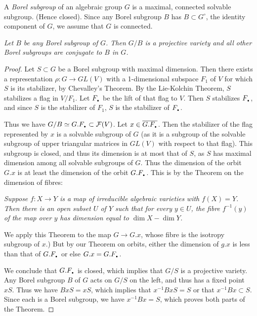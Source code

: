 \documentclass[12pt]{amsart}
\begin{document}
A {\sl Borel subgroup} of an algebraic group $G$ is a maximal, connected
solvable subgroup.  (Hence closed).
Since any Borel subgroup $B$ has $B\subset G^{\circ}$, the identity
component of $G$, we assume that $G$ is connected.
\medskip

{\it
Let $B$ be any Borel subgroup of $G$.
Then $G/B$ is a projective variety and all other Borel subgroups are
conjugate to $B$ in $G$.}\medskip

\begin{proof}
Let $S\subset G$ be a Borel subgroup with maximal dimension.
Then there exists a representation $\rho:G\to GL(V)$ with a 1-dimensional
subspace $F_1$ of $V$ for which $S$ is its stabilizer, by Chevalley's
Theorem. 
By the Lie-Kolchin Theorem, $S$ stabilizes a flag in $V/F_1$.
Let $F_{{\mbox{\Large\bf .}}}$ be the lift of that flag to $V$.
Then $S$ stabilizes $F_{{\mbox{\Large\bf .}}}$, and since $S$ is the stabilizer of $F_1$,
$S$ is the stabilizer of $F_{{\mbox{\Large\bf .}}}$.

Thus we have $G/B\simeq G.F_{{\mbox{\Large\bf .}}}\subset {\mathcal F}(V)$.
Let $x\in \overline{G.F_{{\mbox{\Large\bf .}}}}$.
Then the stabilizer of the flag represented by $x$ is a solvable subgroup of
$G$ (as it is a subgroup of the solvable subgroup of upper triangular
matrices in $GL(V)$ with respect to that flag).
This subgroup is closed, and thus its dimension is at most that of $S$, as
$S$ has maximal dimension among all solvable subgroups of $G$.
Thus the dimension of the orbit $G.x$ is at least the dimension of the orbit
$G.F_{{\mbox{\Large\bf .}}}$.
This is by the Theorem on the dimension of fibres:
\medskip

{\it 
Suppose $f:X\to Y$ is a map of irreducible algebraic varieties with
$f(X)=Y$. 
Then there is an open subset $U$ of $Y$ such that for every $y\in U$, the
fibre $f^{-1}(y)$ of the map over $y$ has  dimension equal to
$\dim X - \dim Y$.
}\medskip

We apply this Theorem to the map $G\to G.x$, whose fibre is the isotropy
subgroup of $x$.)
But by our Theorem on orbits, either the dimension of $g.x$ is less than
that of $G.F_{{\mbox{\Large\bf .}}}$ or else $G.x=G.F_{{\mbox{\Large\bf .}}}$.

We conclude that $G.F_{{\mbox{\Large\bf .}}}$ is closed, which implies that $G/S$ is a
projective variety.
Any Borel subgroup $B$ of $G$ acts on $G/S$ on the left, and thus has a
fixed point $xS$.
Thus we have $BxS=xS$, which implies that $x^{-1}BxS=S$ or that 
$x^{-1}Bx\subset S$.
Since each is a Borel subgroup, we have $x^{-1}Bx=S$, which proves both
parts of the Theorem.
\end{proof}
\end{document}
